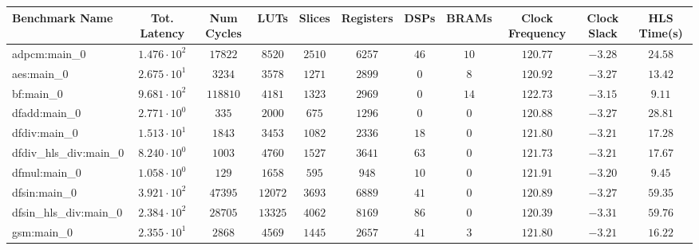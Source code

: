 \begin{tabular}{|l|c|c|c|c|c|c|c|c|c|c|}
\hline
Benchmark Name          & Tot. Latency           & Num Cycles & LUTs      & Slices    & Registers & DSPs    & BRAMs   & Clock Frequency & Clock Slack & HLS Time(s) \\
\hline
adpcm:main\_0           & $ 1.476 \cdot 10^{2} $ & $ 17822  $ & $ 8520  $ & $ 2510  $ & $ 6257  $ & $ 46  $ & $ 10  $ & $ 120.77      $ & $ -3.28   $ & $ 24.58   $ \\
aes:main\_0             & $ 2.675 \cdot 10^{1} $ & $ 3234   $ & $ 3578  $ & $ 1271  $ & $ 2899  $ & $ 0   $ & $ 8   $ & $ 120.92      $ & $ -3.27   $ & $ 13.42   $ \\
bf:main\_0              & $ 9.681 \cdot 10^{2} $ & $ 118810 $ & $ 4181  $ & $ 1323  $ & $ 2969  $ & $ 0   $ & $ 14  $ & $ 122.73      $ & $ -3.15   $ & $ 9.11    $ \\
dfadd:main\_0           & $ 2.771 \cdot 10^{0} $ & $ 335    $ & $ 2000  $ & $ 675   $ & $ 1296  $ & $ 0   $ & $ 0   $ & $ 120.88      $ & $ -3.27   $ & $ 28.81   $ \\
dfdiv:main\_0           & $ 1.513 \cdot 10^{1} $ & $ 1843   $ & $ 3453  $ & $ 1082  $ & $ 2336  $ & $ 18  $ & $ 0   $ & $ 121.80      $ & $ -3.21   $ & $ 17.28   $ \\
dfdiv\_hls\_div:main\_0 & $ 8.240 \cdot 10^{0} $ & $ 1003   $ & $ 4760  $ & $ 1527  $ & $ 3641  $ & $ 63  $ & $ 0   $ & $ 121.73      $ & $ -3.21   $ & $ 17.67   $ \\
dfmul:main\_0           & $ 1.058 \cdot 10^{0} $ & $ 129    $ & $ 1658  $ & $ 595   $ & $ 948   $ & $ 10  $ & $ 0   $ & $ 121.91      $ & $ -3.20   $ & $ 9.45    $ \\
dfsin:main\_0           & $ 3.921 \cdot 10^{2} $ & $ 47395  $ & $ 12072 $ & $ 3693  $ & $ 6889  $ & $ 41  $ & $ 0   $ & $ 120.89      $ & $ -3.27   $ & $ 59.35   $ \\
dfsin\_hls\_div:main\_0 & $ 2.384 \cdot 10^{2} $ & $ 28705  $ & $ 13325 $ & $ 4062  $ & $ 8169  $ & $ 86  $ & $ 0   $ & $ 120.39      $ & $ -3.31   $ & $ 59.76   $ \\
gsm:main\_0             & $ 2.355 \cdot 10^{1} $ & $ 2868   $ & $ 4569  $ & $ 1445  $ & $ 2657  $ & $ 41  $ & $ 3   $ & $ 121.80      $ & $ -3.21   $ & $ 16.22   $ \\

\end{tabular}
